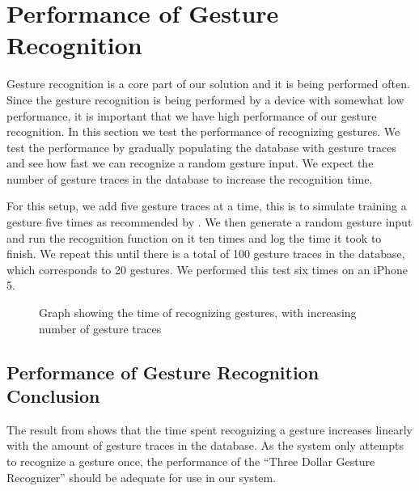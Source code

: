 \section{Performance of Gesture Recognition}\label{sec:gestureperformance}
Gesture recognition is a core part of our solution and it is being performed often. 
Since the gesture recognition is being performed by a device with somewhat low performance,
it is important that we have high performance of our gesture recognition. 
In this section we test the performance of recognizing gestures. 
We test the performance by gradually populating the database with gesture traces and see how fast we can recognize a random gesture input.
We expect the number of gesture traces in the database to increase the recognition time.

For this setup, we add five gesture traces at a time, this is to simulate training a gesture five times as recommended by \cite{threedollar}. We then generate a random gesture input and run the recognition function on it ten times and log the time it took to finish.
We repeat this until there is a total of 100 gesture traces in the database, which corresponds to 20 gestures.
We performed this test six times on an iPhone 5.

\begin{figure}[!htb]
    \centering
    
    \caption{Graph showing the time of recognizing gestures, with increasing number of gesture traces}
    \label{fig:performancegraph}
\end{figure}

\subsection{Performance of Gesture Recognition Conclusion}
The result from  shows that the time spent recognizing a gesture increases linearly with the amount of gesture traces in the database.
As the system only attempts to recognize a gesture once, the performance of the ``Three Dollar Gesture Recognizer'' should be adequate for use in our system. 
